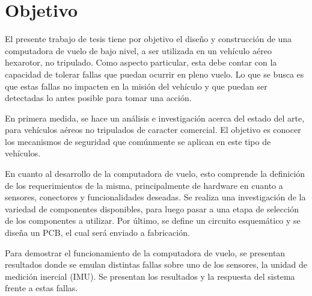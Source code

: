 \section{Objetivo}


El presente trabajo de tesis tiene por objetivo el diseño y construcción de una computadora de vuelo de bajo nivel, a ser utilizada en un vehículo aéreo hexarotor, no tripulado. Como aspecto particular, esta debe contar con la capacidad de tolerar fallas %
que puedan ocurrir en pleno vuelo. Lo que se busca es que estas fallas no impacten en la misión del vehículo y que puedan ser detectadas lo antes posible para tomar una acción.

En primera medida, se hace un análisis e investigación acerca del estado del arte, para vehículos aéreos no tripulados de caracter comercial. El objetivo es conocer los mecanismos de seguridad que comúnmente se aplican en este tipo de vehículos.%

En cuanto al desarrollo de la computadora de vuelo, esto comprende la definición de los requerimientos de la misma, principalmente de hardware en cuanto a sensores, conectores y funcionalidades deseadas. Se realiza una investigación de la variedad de componentes disponibles, para luego pasar a una etapa de selección de los componentes a utilizar. Por último, se define un circuito esquemático y se diseña un PCB, el cual será enviado a fabricación.



Para demostrar el funcionamiento de la computadora de vuelo, se presentan resultados donde se emulan distintas fallas sobre uno de los sensores, la unidad de medición inercial (IMU). Se presentan los resultados y la respuesta del sistema frente a estas fallas.